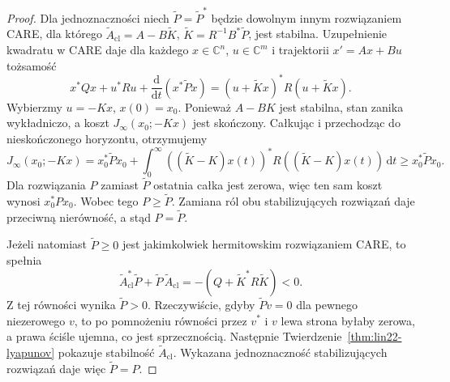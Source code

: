 \begin{proof}
Dla jednoznaczności
niech \(\widetilde P=\widetilde P^*\)
będzie dowolnym innym
rozwiązaniem CARE,
dla którego
\(\widetilde A_{\mathrm{cl}}
 =A-B\widetilde K\),
\(\widetilde K=R^{-1}B^*\widetilde P\),
jest stabilna.
Uzupełnienie kwadratu
w CARE daje dla
każdego \(x\in\mathbb C^n\),
\(u\in\mathbb C^m\)
i trajektorii \(x'=Ax+Bu\)
tożsamość
\[
 x^*Qx+u^*Ru+
 \frac{\mathrm d}{\mathrm dt}
      (x^*\widetilde Px)
 =(u+\widetilde Kx)^*R
       (u+\widetilde Kx).
\]
Wybierzmy
\(u=-Kx\), \(x(0)=x_0\).
Ponieważ \(A-BK\) jest stabilna,
stan zanika wykładniczo,
a koszt
\(J_\infty(x_0;-Kx)\)
jest skończony.
Całkując i przechodząc do
nieskończonego horyzontu,
otrzymujemy
\[
 J_\infty(x_0;-Kx)
 =x_0^*\widetilde Px_0+
  \int_0^\infty
       ((\widetilde K-K)x(t))^*
       R((\widetilde K-K)x(t))
    \,\mathrm dt
 \ge x_0^*\widetilde Px_0.
\]
Dla rozwiązania \(P\)
zamiast \(\widetilde P\)
ostatnia całka jest zerowa,
więc ten sam koszt wynosi
\(x_0^*Px_0\).
Wobec tego
\(P\ge\widetilde P\).
Zamiana ról obu
stabilizujących rozwiązań
daje przeciwną nierówność,
a stąd \(P=\widetilde P\).

Jeżeli natomiast
\(\widetilde P\ge0\)
jest jakimkolwiek hermitowskim
rozwiązaniem CARE,
to spełnia
\[
 \widetilde A_{\mathrm{cl}}^*
       \widetilde P+
 \widetilde P\,\widetilde A_{\mathrm{cl}}
 =-(Q+\widetilde K^*R\widetilde K)<0.
\]
Z tej równości wynika
\(\widetilde P>0\).
Rzeczywiście, gdyby
\(\widetilde Pv=0\)
dla pewnego niezerowego \(v\),
to po pomnożeniu równości
przez \(v^*\) i \(v\)
lewa strona byłaby zerowa,
a prawa ściśle ujemna,
co jest sprzecznością.
Następnie
Twierdzenie~\ref{thm:lin22-lyapunov}
pokazuje stabilność
\(\widetilde A_{\mathrm{cl}}\).
Wykazana jednoznaczność
stabilizujących rozwiązań
daje więc \(\widetilde P=P\).
\end{proof}

